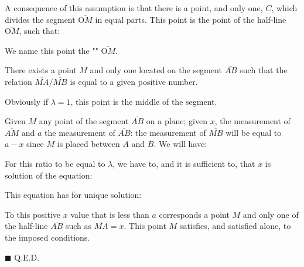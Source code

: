 	A consequence of this assumption is that there is a point, and only one, $C$, which divides the segment $\overline{\text{O}M}$ in equal parts. This point is the point of the half-line $\overline{\text{O}M}$, such that:
	
	We name this point the "" $\overline{\text{O}M}$.
	\begin{theorem}
	There exists a point $M$ and only one located on the segment $\overline{AB}$ such that the relation $\overline{MA}/\overline{MB}$ is equal to a given positive number.
	\end{theorem}
	\begin{tcolorbox}[title=Remark,colframe=black,arc=10pt]
	Obviously if $\lambda=1$, this point is the middle of the segment.
	\end{tcolorbox}
	\begin{dem}
	Given $M$ any point of the segment $\overline{AB}$ on a plane; given $x$, the measurement of $\overline{AM}$ and $a$  the measurement of $\overline{AB}$: the measurement of $\overline{MB}$ will be equal to $a-x$ since $M$ is placed between $A$ and $B$. We will have:
	
	For this ratio to be equal to $\lambda$, we have to, and it is sufficient to, that $x$ is solution of the equation:
	
	This equation has for unique solution:
	
	To this positive $x$ value that is less than $a$ corresponds a point $M$ and only one of the half-line $\overline{AB}$ such as $\overline{MA} = x$. This point $M$ satisfies, and satisfied alone, to the imposed conditions.
	\begin{flushright}
		$\blacksquare$  Q.E.D.
	\end{flushright}
	\end{dem}
	
